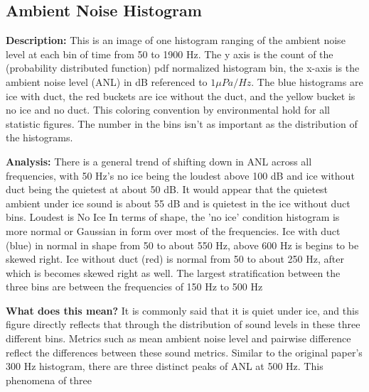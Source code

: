 \subsection{Ambient Noise Histogram}
\textbf{Description: }
This is an image of one histogram ranging of the ambient noise level at each bin of time from 50 to 1900 Hz. The y axis is the count of the (probability distributed function) pdf normalized histogram bin, the x-axis is the ambient noise level (ANL) in dB referenced to  $1 \mu Pa/Hz$. The blue histograms are ice with duct, the red buckets are ice without the duct, and the yellow bucket is no ice and no duct. This coloring convention by environmental  hold for all statistic figures. The number in the bins isn’t as important as the distribution of the histograms. 

\textbf{Analysis: }
There is a general trend of shifting down in ANL across all frequencies, with 50 Hz’s no ice being the loudest above 100 dB and ice without duct being the quietest at about 50 dB. It would appear that the quietest ambient under ice sound is about 55 dB and is quietest in the ice without duct bins. Loudest is No Ice
In terms of shape, the 'no ice' condition histogram is more normal or Gaussian in form over most of the frequencies. Ice with duct (blue) in normal in shape from 50 to about 550 Hz, above 600 Hz is begins to be skewed right. Ice without duct (red) is normal from 50 to about 250 Hz, after which is becomes skewed right as well.
The largest stratification between the three bins are between the frequencies of 150 Hz to 500 Hz

\textbf{What does this mean?}
It is commonly said that it is quiet under ice, and this figure directly reflects that through the distribution of sound levels in these three different bins. Metrics such as mean ambient noise level and pairwise difference reflect the differences between these sound metrics. Similar to the original paper's 300 Hz histogram\autocite{BonnelMain}, there are three distinct peaks of ANL at 500 Hz. This phenomena of three 

